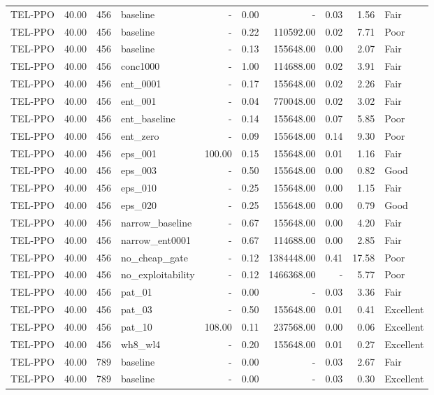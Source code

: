 \begin{table}[htbp]
\begin{tabular}{lrrlrrrrrl}
TEL-PPO & 40.00 & 456 & baseline & - & 0.00 & - & 0.03 & 1.56 & Fair \\
TEL-PPO & 40.00 & 456 & baseline & - & 0.22 & 110592.00 & 0.02 & 7.71 & Poor \\
TEL-PPO & 40.00 & 456 & baseline & - & 0.13 & 155648.00 & 0.00 & 2.07 & Fair \\
TEL-PPO & 40.00 & 456 & conc1000 & - & 1.00 & 114688.00 & 0.02 & 3.91 & Fair \\
TEL-PPO & 40.00 & 456 & ent_0001 & - & 0.17 & 155648.00 & 0.02 & 2.26 & Fair \\
TEL-PPO & 40.00 & 456 & ent_001 & - & 0.04 & 770048.00 & 0.02 & 3.02 & Fair \\
TEL-PPO & 40.00 & 456 & ent_baseline & - & 0.14 & 155648.00 & 0.07 & 5.85 & Poor \\
TEL-PPO & 40.00 & 456 & ent_zero & - & 0.09 & 155648.00 & 0.14 & 9.30 & Poor \\
TEL-PPO & 40.00 & 456 & eps_001 & 100.00 & 0.15 & 155648.00 & 0.01 & 1.16 & Fair \\
TEL-PPO & 40.00 & 456 & eps_003 & - & 0.50 & 155648.00 & 0.00 & 0.82 & Good \\
TEL-PPO & 40.00 & 456 & eps_010 & - & 0.25 & 155648.00 & 0.00 & 1.15 & Fair \\
TEL-PPO & 40.00 & 456 & eps_020 & - & 0.25 & 155648.00 & 0.00 & 0.79 & Good \\
TEL-PPO & 40.00 & 456 & narrow_baseline & - & 0.67 & 155648.00 & 0.00 & 4.20 & Fair \\
TEL-PPO & 40.00 & 456 & narrow_ent0001 & - & 0.67 & 114688.00 & 0.00 & 2.85 & Fair \\
TEL-PPO & 40.00 & 456 & no_cheap_gate & - & 0.12 & 1384448.00 & 0.41 & 17.58 & Poor \\
TEL-PPO & 40.00 & 456 & no_exploitability & - & 0.12 & 1466368.00 & - & 5.77 & Poor \\
TEL-PPO & 40.00 & 456 & pat_01 & - & 0.00 & - & 0.03 & 3.36 & Fair \\
TEL-PPO & 40.00 & 456 & pat_03 & - & 0.50 & 155648.00 & 0.01 & 0.41 & Excellent \\
TEL-PPO & 40.00 & 456 & pat_10 & 108.00 & 0.11 & 237568.00 & 0.00 & 0.06 & Excellent \\
TEL-PPO & 40.00 & 456 & wh8_wl4 & - & 0.20 & 155648.00 & 0.01 & 0.27 & Excellent \\
TEL-PPO & 40.00 & 789 & baseline & - & 0.00 & - & 0.03 & 2.67 & Fair \\
TEL-PPO & 40.00 & 789 & baseline & - & 0.00 & - & 0.03 & 0.30 & Excellent \\

\end{tabular}
\end{table}
